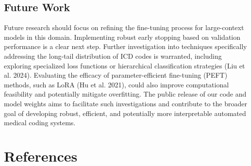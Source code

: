 \documentclass[
]{article}
\begin{document}
\subsection{Future Work}\label{future-work}

Future research should focus on refining the fine-tuning process for
large-context models in this domain. Implementing robust early stopping
based on validation performance is a clear next step. Further
investigation into techniques specifically addressing the long-tail
distribution of ICD codes is warranted, including exploring specialized
loss functions or hierarchical classification strategies (Liu et al.
2024). Evaluating the efficacy of parameter-efficient fine-tuning (PEFT)
methods, such as LoRA (Hu et al. 2021), could also improve computational
feasibility and potentially mitigate overfitting. The public release of
our code and model weights aims to facilitate such investigations and
contribute to the broader goal of developing robust, efficient, and
potentially more interpretable automated medical coding systems.

\section*{References}\label{references}
\end{document}
